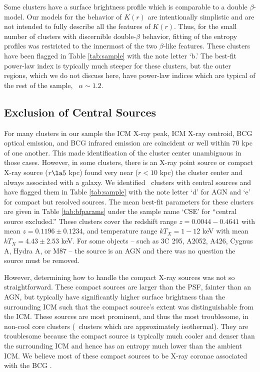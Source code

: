 Some clusters have a surface brightness profile which is comparable to
a double $\beta$-model. Our models for the behavior of $K(r)$ are
intentionally simplistic and are not intended to fully describe all
the features of $K(r)$. Thus, for the small number of clusters with
discernible double-$\beta$ behavior, fitting of the entropy profiles
was restricted to the innermost of the two $\beta$-like
features. These clusters have been flagged in Table \ref{tab:sample}
with the note letter `b.' The best-fit power-law index is typically
much steeper for these clusters, but the outer regions, which we do
not discuss here, have power-law indices which are typical of the rest
of the sample, \ie\ $\alpha \sim 1.2$.

\subsection{Exclusion of Central Sources}
\label{sec:entsuppcentsrc}

For many clusters in our sample the ICM X-ray peak, ICM X-ray
centroid, BCG optical emission, and BCG infrared emission are
coincident or well within 70 kpc of one another. This made
identification of the cluster center unambiguous in those
cases. However, in some clusters, there is an X-ray point source or
compact X-ray source ($r \la 5$ kpc) found very near ($r < 10$ kpc)
the cluster center and always associated with a galaxy. We identified
\centsrcnum\ clusters with central sources and have flagged them in
Table \ref{tab:sample} with the note letter `d' for AGN and `e' for
compact but resolved sources. The mean best-fit parameters for these
clusters are given in Table \ref{tab:bfparams} under the sample name
`CSE' for ``central source excluded.'' These clusters cover the
redshift range $z = 0.0044-0.4641$ with mean $z = 0.1196 \pm 0.1234$,
and temperature range $kT_X = 1-12$ keV with mean $kT_X = 4.43 \pm
2.53$ keV. For some objects -- such as 3C 295, A2052, A426, Cygnus A,
Hydra A, or M87 -- the source is an AGN and there was no question the
source must be removed.

However, determining how to handle the compact X-ray sources was not
so straightforward. These compact sources are larger than the PSF,
fainter than an AGN, but typically have significantly higher surface
brightness than the surrounding ICM such that the compact source's
extent was distinguishable from the ICM. These sources are most
prominent, and thus the most troublesome, in non-cool core clusters
(\ie\ clusters which are approximately isothermal). They are
troublesome because the compact source is typically much cooler and
denser than the surrounding ICM and hence has an entropy much lower
than the ambient ICM. We believe most of these compact sources to be
X-ray coronae associated with the BCG \citep[see][for discussion of
  BCG coronae]{coronae}.

